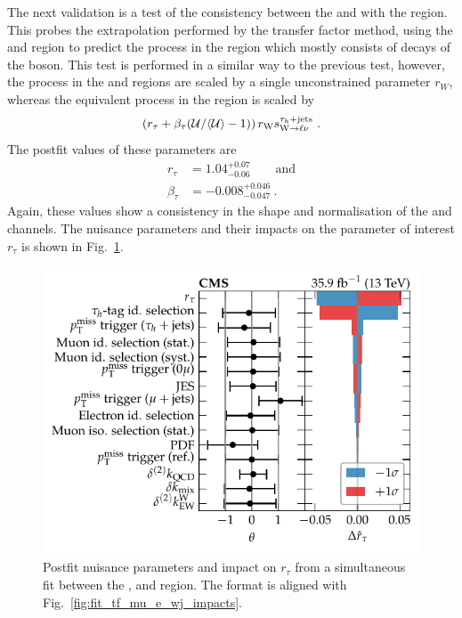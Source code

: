 The next validation is a test of the consistency between the \muplusjets and \eleplusjets with the \tauplusjets region. This probes the extrapolation performed by the transfer factor method, using the \muplusjets and \eleplusjets region to predict the \IWj process in the \metplusjets region which mostly consists of \Ptauh decays of the \PW boson. This test is performed in a similar way to the previous test, however, the \IWj process in the \muplusjets and \eleplusjets regions are scaled by a single unconstrained parameter $r_W$, whereas the equivalent process in the \tauplusjets region is scaled by
%
\begin{equation}
    \left(r_\tau + \beta_\tau (\mathcal{U}/\langle \mathcal{U} \rangle - 1)\right) r_\PW s_{\IWlv}^{\tauplusjets}\ .
\end{equation}
%
The postfit values of these parameters are
%
\begin{align}
    r_\tau & = 1.04^{+0.07}_{-0.06}\qquad\mathrm{and} \nonumber\\
    \beta_\tau & = -0.008^{+0.046}_{-0.047}\ .
\end{align}
%
Again, these values show a consistency in the shape and normalisation of the \ellplusjets and \tauplusjets channels. The nuisance parameters and their impacts on the parameter of interest $r_\tau$ is shown in Fig.~\ref{fig:fit_tf_mue_t_wj_impacts}.
%
\begin{figure}[htb]
    \centering
    \includegraphics{chapters/042_backgrounds/images/impacts_tfmue2twj.pdf}
    \caption[Nuisance parameters from a fit with the transfer factor method from the muon and electron control regions to the $\tau$-lepton validation region.]{
        Postfit nuisance parameters and impact on $r_\tau$ from a simultaneous fit between the \muplusjets, \eleplusjets and \tauplusjets region. The format is aligned with Fig.~\ref{fig:fit_tf_mu_e_wj_impacts}.
    }
    \label{fig:fit_tf_mue_t_wj_impacts}
\end{figure}
